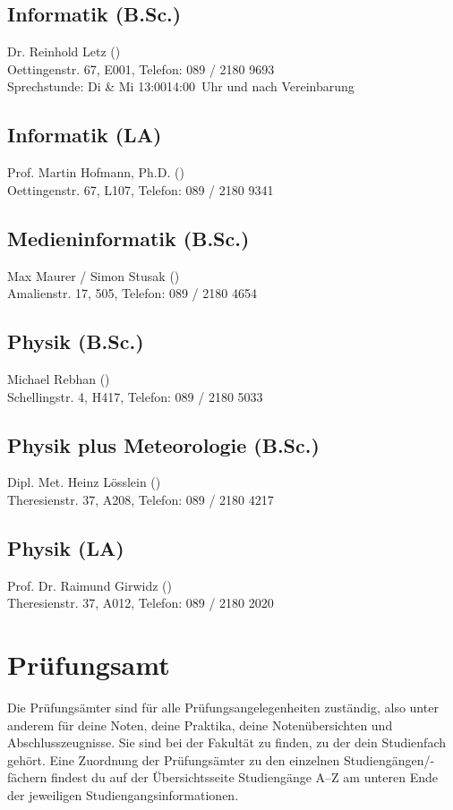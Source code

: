 \subsection*{Informatik (B.Sc.)\subjectList{\subjectI}}
Dr. Reinhold Letz ()\\
Oettingenstr. 67, E001, Telefon: 089 / 2180 \emd{} 9693\\
Sprechstunde: Di \& Mi 13:00\emd{}14:00~Uhr und nach Vereinbarung

\subsection*{Informatik (LA)\subjectList{\subjectI}}
Prof. Martin Hofmann, Ph.D. ()\\
Oettingenstr. 67, L107, Telefon: 089 / 2180 \emd{} 9341

\subsection*{Medieninformatik (B.Sc.)\subjectList{\subjectMI}}
Max Maurer / Simon Stusak ()\\
Amalienstr. 17, 505, Telefon: 089 / 2180 \emd{} 4654

\subsection*{Physik (B.Sc.)\subjectList{\subjectP}}
Michael Rebhan ()\\
Schellingstr. 4, H417, Telefon: 089 / 2180 \emd{} 5033

\subsection*{Physik plus Meteorologie (B.Sc.)\subjectList{\subjectP}}
Dipl. Met. Heinz Lösslein ()\\
Theresienstr. 37, A208, Telefon: 089 / 2180 \emd{} 4217

\subsection*{Physik (LA)\subjectList{\subjectP}}
Prof. Dr. Raimund Girwidz ()\\
Theresienstr. 37, A012, Telefon: 089 / 2180 \emd{} 2020


\section{Prüfungsamt}
Die Prüfungsämter sind für alle Prüfungsangelegenheiten zuständig,
also unter anderem für deine Noten, deine Praktika, deine Notenübersichten und
Abschlusszeugnisse. Sie sind bei der Fakultät zu finden, zu der
dein Studienfach gehört. Eine Zuordnung der Prüfungsämter zu den
einzelnen Studiengängen/-fächern findest du auf der Übersichtsseite
Studiengänge A--Z am unteren Ende der jeweiligen
Studiengangsinformationen.

